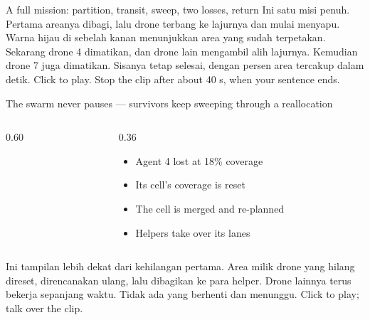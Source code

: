 \documentclass[aspectratio=169,11pt,t]{beamer}
\begin{document}
\begin{frame}{A full mission: partition, transit, sweep, two losses, return}
  \centering
    {Ini satu misi penuh. Pertama areanya dibagi, lalu drone terbang ke lajurnya dan mulai menyapu. Warna hijau di sebelah kanan menunjukkan area yang sudah terpetakan. Sekarang drone 4 dimatikan, dan drone lain mengambil alih lajurnya. Kemudian drone 7 juga dimatikan. Sisanya tetap selesai, dengan \CovRectHinf\space persen area tercakup dalam \TmisRectHinf\space detik.}
    {Click to play. Stop the clip after about 40 s, when your sentence ends.}
\end{frame}

\begin{frame}{The swarm never pauses --- survivors keep sweeping through a reallocation}
  \begin{columns}[T,onlytextwidth]
    \begin{column}{0.60\textwidth}
    \end{column}
    \begin{column}{0.36\textwidth}
      \vskip3mm
      \begin{itemize}\bulletgap
        \item Agent 4 lost at 18\% coverage
        \item Its cell's coverage is reset
        \item The cell is merged and re-planned
        \item Helpers take over its lanes
      \end{itemize}
    \end{column}
  \end{columns}
    {Ini tampilan lebih dekat dari kehilangan pertama. Area milik drone yang hilang direset, direncanakan ulang, lalu dibagikan ke para helper. Drone lainnya terus bekerja sepanjang waktu. Tidak ada yang berhenti dan menunggu.}
    {Click to play; talk over the clip.}
\end{frame}
\end{document}
